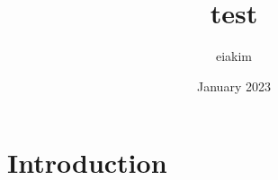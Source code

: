 \documentclass{article}
\title{test}
\author{eiakim }
\date{January 2023}
\begin{document}
\maketitle

\section{Introduction}
\end{document}
